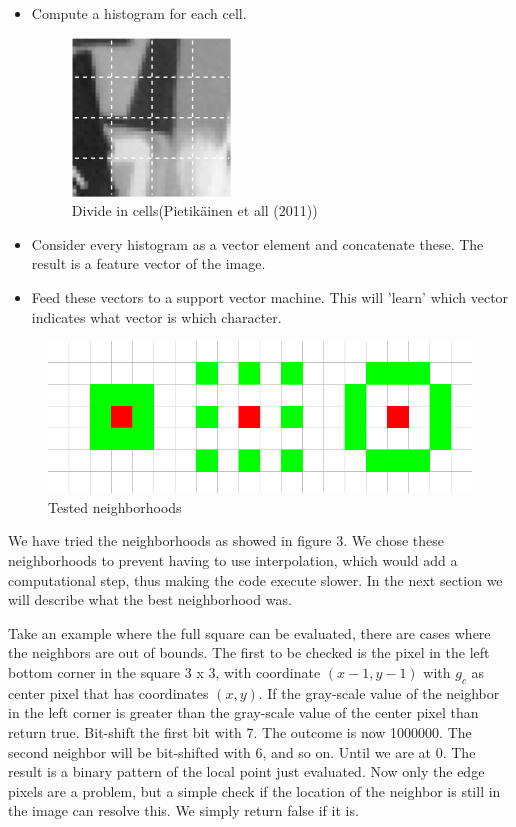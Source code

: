\documentclass[a4paper]{article}
\begin{document}
\begin{itemize}
\item Compute a histogram for each cell.

\begin{figure}[h!]
\center
\includegraphics[scale=0.7]{cells.png}
\caption{Divide in cells(Pietik\"ainen et all (2011))}
\end{figure}

\item Consider every histogram as a vector element and concatenate these. The
result is a feature vector of the image.

\item Feed these vectors to a support vector machine. This will 'learn' which
vector indicates what vector is which character.

\end{itemize}

\begin{figure}[h!]
\center
\includegraphics[scale=0.5]{neighbourhoods.png}
\caption{Tested neighborhoods}
\end{figure}

We have tried the neighborhoods as showed in figure 3. We chose these
neighborhoods to prevent having to use interpolation, which would add a
computational step, thus making the code execute slower. In the next section we
will describe what the best neighborhood was.

Take an example where the full square can be evaluated, there are cases where
the neighbors are out of bounds. The first to be checked is the pixel in the
left bottom corner in the square 3 x 3, with coordinate $(x - 1, y - 1)$ with
$g_c$ as center pixel that has coordinates $(x, y)$. If the gray-scale value of
the neighbor in the left corner is greater than the gray-scale value of the
center pixel than return true. Bit-shift the first bit with 7. The outcome is
now 1000000. The second neighbor will be bit-shifted with 6, and so on. Until we
are at 0. The result is a binary pattern of the local point just evaluated. Now
only the edge pixels are a problem, but a simple check if the location of the
neighbor is still in the image can resolve this. We simply return false if it
is.
\end{document}
